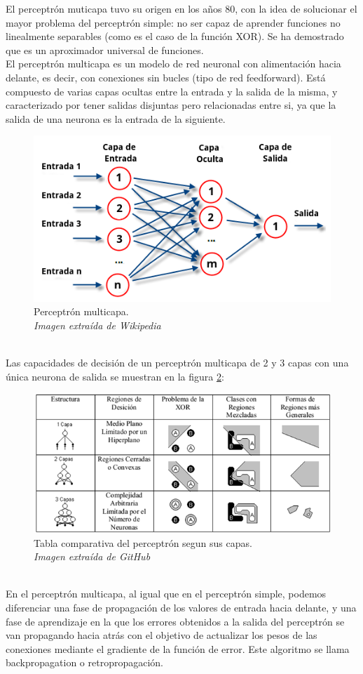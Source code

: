 El perceptrón muticapa tuvo su origen en los años 80, con la idea de solucionar el mayor problema del perceptrón simple: no ser capaz de aprender funciones no linealmente separables (como es el caso de la función XOR). Se ha demostrado que es un aproximador universal de funciones.
\\El perceptrón multicapa es un modelo de red neuronal con alimentación hacia delante, es decir, con conexiones sin bucles (tipo de red feedforward). Está compuesto de varias capas ocultas entre la entrada y la salida de la misma, y caracterizado por tener salidas disjuntas pero relacionadas entre si, ya que la salida de una neurona es la entrada de la siguiente.
\begin{figure}[htp]
\centering
\includegraphics[scale=1.2]{images/multilayerperceptron.png}
\caption{Perceptrón multicapa.\\\textit{Imagen extraída de Wikipedia}}
\label{ooo}
\end{figure}
\\Las capacidades de decisión de un perceptrón multicapa de 2 y 3 capas con una única neurona de salida se muestran en la figura \ref{tabla_perceptron}:
\begin{figure}[htp]
\centering
\includegraphics[scale=0.7]{images/perceptron23capas.png}
\caption{Tabla comparativa del perceptrón segun sus capas.\\\textit{Imagen extraída de GitHub}}
\label{tabla_perceptron}
\end{figure}
\\En el perceptrón multicapa, al igual que en el perceptrón simple, podemos diferenciar una fase de propagación de los valores de entrada hacia delante, y una fase de aprendizaje en la que los errores obtenidos a la salida del perceptrón se van propagando hacia atrás con el objetivo de actualizar los pesos de las conexiones mediante el gradiente de la función de error. Este algoritmo se llama backpropagation o retropropagación.
